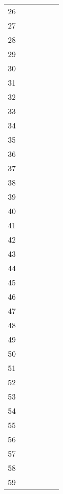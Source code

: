 \begin{longtable}[l]{|c|l|l|l|l|l|}
	26 	& 					& 					& 					& 					\\ 
	27 	& 					& 					& 					&					\\ 	
	28 	& 					& 					& 					&					\\ 
	29 	& 		 			& 					& 					& 					\\ 
	30 	& 					& 					& 					& 					\\ 
	31 	& 					& 					& 					&					\\ 	
	32 	& 					& 					& 					&					\\ 
	33 	& 		 			& 					& 					& 					\\ 
	34 	& 					& 					& 					& 					\\ 
	35 	& 					& 					& 					&					\\ 	
	36 	& 					& 					& 					&					\\ 
	37 	& 		 			& 					& 					& 					\\ 
	38 	& 					& 					& 					& 					\\ 
	39 	& 					& 					& 					&					\\ 	
	40 	& 					& 					& 					&					\\ 
	41 	& 		 			& 					& 					& 					\\ 
	42 	& 					& 					& 					& 					\\ 
	43 	& 					& 					& 					&					\\ 	
	44 	& 					& 					& 					&					\\ 
	45 	& 		 			& 					& 					& 					\\ 
	46 	& 					& 					& 					& 					\\ 
	47 	& 					& 					& 					&					\\ 	
	48 	& 					& 					& 					&					\\ 
	49 	& 		 			& 					& 					& 					\\ 
	50 	& 					& 					& 					& 					\\ 
	51 	& 					& 					& 					&					\\ 	
	52 	& 					& 					& 					&					\\ 
	53 	& 		 			& 					& 					& 					\\ 
	54 	& 					& 					& 					& 					\\ 
	55 	& 					& 					& 					&					\\ 	
	56 	& 					& 					& 					&					\\ 
	57 	& 		 			& 					& 					& 					\\ 
	58 	& 					& 					& 					& 					\\ 
	59 	& 					& 					& 					&					\\ 	

\end{longtable}
